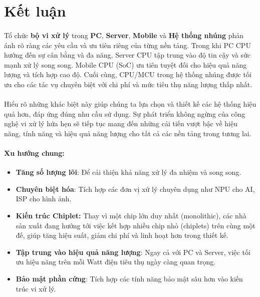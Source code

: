 \newpage
\section{Kết luận}

\paragraph{}{Tổ chức \textbf{bộ vi xử lý} trong \textbf{PC}, \textbf{Server}, \textbf{Mobile} và \textbf{Hệ thống nhúng} phản ánh rõ ràng các yêu cầu và ưu tiên riêng của từng nền tảng. Trong khi PC CPU hướng đến sự cân bằng và đa năng, Server CPU tập trung vào độ tin cậy và sức mạnh xử lý song song. Mobile CPU (SoC) ưu tiên tuyệt đối cho hiệu quả năng lượng và tích hợp cao độ. Cuối cùng, CPU/MCU trong hệ thống nhúng được tối ưu cho các tác vụ chuyên biệt với chi phí và mức tiêu thụ năng lượng thấp nhất.}

\paragraph{}{Hiểu rõ những khác biệt này giúp chúng ta lựa chọn và thiết kế các hệ thống hiệu quả hơn, đáp ứng đúng nhu cầu sử dụng. Sự phát triển không ngừng của công nghệ vi xử lý hứa hẹn sẽ tiếp tục mang đến những cải tiến vượt bậc về hiệu năng, tính năng và hiệu quả năng lượng cho tất cả các nền tảng trong tương lai.}

\paragraph{Xu hướng chung:}

\begin{itemize}
    \item \textbf{Tăng số lượng lõi}: Để cải thiện khả năng xử lý đa nhiệm và song song.
    
    \item \textbf{Chuyên biệt hóa}: Tích hợp các đơn vị xử lý chuyên dụng như NPU cho AI, ISP cho hình ảnh.

    \item \textbf{Kiến trúc Chiplet:} Thay vì một chip lớn duy nhất (monolithic), các nhà sản xuất đang hướng tới việc kết hợp nhiều chip nhỏ (chiplets) trên cùng một đế, giúp tăng hiệu suất, giảm chi phí và linh hoạt hơn trong thiết kế.

    \item \textbf{Tập trung vào hiệu quả năng lượng}: Ngay cả với PC và Server, việc tối ưu hiệu năng trên mỗi Watt điện tiêu thụ ngày càng quan trọng.
    
    \item \textbf{Bảo mật phần cứng}: Tích hợp các tính năng bảo mật sâu hơn vào kiến trúc vi xử lý.
\end{itemize}

\pagebreak